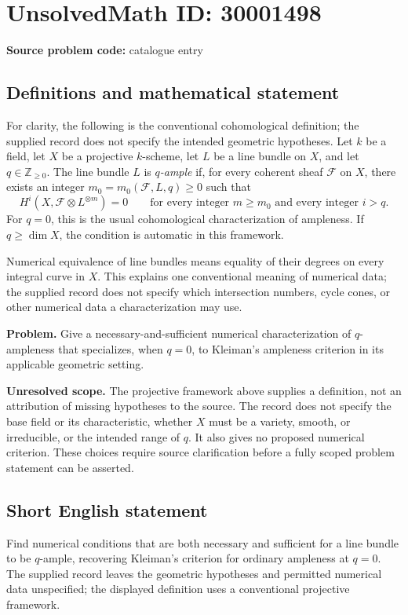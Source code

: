 \documentclass[11pt]{article}
\newcommand{\Z}{\mathbb{Z}}
\begin{document}
\section*{UnsolvedMath ID: 30001498}
\textbf{Source problem code:} catalogue entry
\subsection{Definitions and mathematical statement}
For clarity, the following is the conventional cohomological definition; the supplied record does not specify the intended geometric hypotheses. Let \(k\) be a field, let \(X\) be a projective \(k\)-scheme, let \(L\) be a line bundle on \(X\), and let \(q\in\Z_{\geq 0}\). The line bundle \(L\) is \emph{\(q\)-ample} if, for every coherent sheaf \(\mathcal F\) on \(X\), there exists an integer \(m_0=m_0(\mathcal F,L,q)\geq 0\) such that
\[
H^i\!\left(X,\mathcal F\otimes L^{\otimes m}\right)=0
\qquad\text{for every integer }m\geq m_0\text{ and every integer }i>q.
\]
For \(q=0\), this is the usual cohomological characterization of ampleness. If \(q\geq\dim X\), the condition is automatic in this framework.

Numerical equivalence of line bundles means equality of their degrees on every integral curve in \(X\). This explains one conventional meaning of numerical data; the supplied record does not specify which intersection numbers, cycle cones, or other numerical data a characterization may use.

\textbf{Problem.} Give a necessary-and-sufficient numerical characterization of \(q\)-ampleness that specializes, when \(q=0\), to Kleiman's ampleness criterion in its applicable geometric setting.

\textbf{Unresolved scope.} The projective framework above supplies a definition, not an attribution of missing hypotheses to the source. The record does not specify the base field or its characteristic, whether \(X\) must be a variety, smooth, or irreducible, or the intended range of \(q\). It also gives no proposed numerical criterion. These choices require source clarification before a fully scoped problem statement can be asserted.
\subsection{Short English statement}
Find numerical conditions that are both necessary and sufficient for a line bundle to be \(q\)-ample, recovering Kleiman's criterion for ordinary ampleness at \(q=0\). The supplied record leaves the geometric hypotheses and permitted numerical data unspecified; the displayed definition uses a conventional projective framework.
\end{document}
